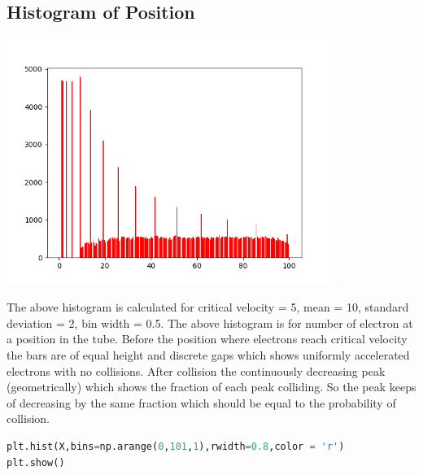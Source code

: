 \documentclass[a4paper]{article}
\begin{document}
\subsection{Histogram of Position}
\begin{center}
\includegraphics[width=0.8\textwidth]{Figure_2-v4.png}
\end{center}
The above histogram is calculated for critical velocity = 5, mean = 10, standard deviation = 2, bin width = 0.5.
The above histogram is for number of electron at a position in the tube. Before the position where electrons reach critical velocity the bars are of equal height and discrete gaps which shows uniformly accelerated electrons with no collisions. After collision the continuously decreasing peak (geometrically) which shows the fraction of each peak colliding. So the peak keeps of decreasing by the same fraction which should be equal to the probability of collision.
\begin{lstlisting}[language=Python]
plt.hist(X,bins=np.arange(0,101,1),rwidth=0.8,color = 'r')
plt.show()
\end{lstlisting}
\end{document}

